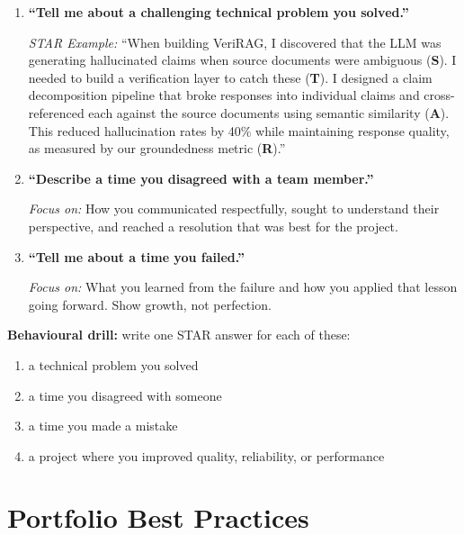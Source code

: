 \documentclass[12pt, a4paper, oneside]{book}
\begin{document}
\begin{enumerate}[leftmargin=2em]
    \item \textbf{``Tell me about a challenging technical problem you solved.''}

    \emph{STAR Example:} ``When building VeriRAG, I discovered that the LLM was generating hallucinated claims when source documents were ambiguous (\textbf{S}). I needed to build a verification layer to catch these (\textbf{T}). I designed a claim decomposition pipeline that broke responses into individual claims and cross-referenced each against the source documents using semantic similarity (\textbf{A}). This reduced hallucination rates by 40\% while maintaining response quality, as measured by our groundedness metric (\textbf{R}).''

    \item \textbf{``Describe a time you disagreed with a team member.''}

    \emph{Focus on:} How you communicated respectfully, sought to understand their perspective, and reached a resolution that was best for the project.

    \item \textbf{``Tell me about a time you failed.''}

    \emph{Focus on:} What you learned from the failure and how you applied that lesson going forward. Show growth, not perfection.
\end{enumerate}

\begin{exercisebox}
\textbf{Behavioural drill:} write one STAR answer for each of these:
\begin{enumerate}[leftmargin=2em]
    \item a technical problem you solved
    \item a time you disagreed with someone
    \item a time you made a mistake
    \item a project where you improved quality, reliability, or performance
\end{enumerate}
\end{exercisebox}

\section{Portfolio Best Practices}
\end{document}
